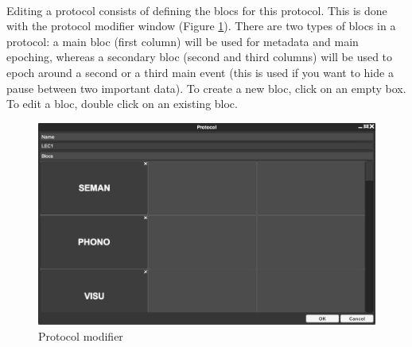 \documentclass[a4paper]{article}
\begin{document}
\paragraph{} Editing a protocol consists of defining the blocs for this protocol. This is done with the protocol modifier window (Figure \ref{protocolModifierUI}). There are two types of blocs in a protocol: a main bloc (first column) will be used for metadata and main epoching, whereas a secondary bloc (second and third columns) will be used to epoch around a second or a third main event (this is used if you want to hide a pause between two important data). To create a new bloc, click on an empty box. To edit a bloc, double click on an existing bloc.
\begin{figure}[H]
\begin{center}
\includegraphics[scale=0.3]{ProtocolModifier.png}
\end{center}
\caption{\label{protocolModifierUI}Protocol modifier}
\end{figure}
\end{document}
